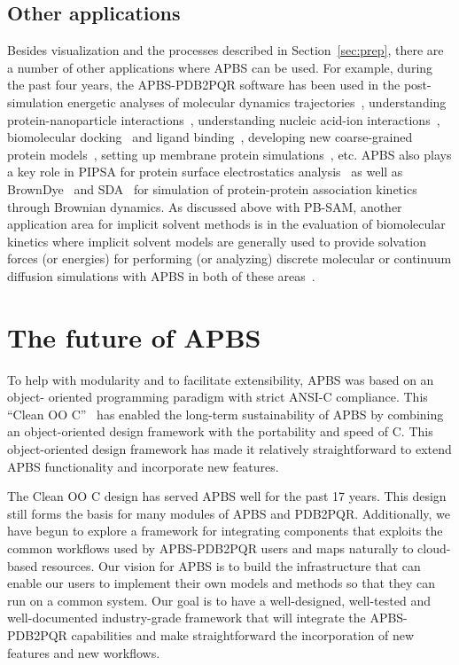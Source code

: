 \documentclass[12pt,titlepage]{article}
\newcommand{\revision}[1]{#1}
\begin{document}
\subsection{Other applications}
Besides visualization and the processes described in Section~\ref{sec:prep}, there are a number of other applications where APBS can be used.
For example, during the past four years, the APBS-PDB2PQR software has been used in the post-simulation energetic analyses of molecular dynamics trajectories~\cite{Dror2013}, understanding protein-nanoparticle interactions~\cite{Treuel2013, DePaoli2014}, understanding nucleic acid-ion interactions~\cite{Lipfert2014}, biomolecular docking~\cite{Roberts2013} and ligand binding~\cite{Evangelidis2009}, developing new coarse-grained protein models~\cite{Spiga2013}, setting up membrane protein simulations~\cite{Stansfeld2015}, etc.
APBS also plays a key role in PIPSA for protein surface electrostatics analysis~\cite{Richter2008} as well as BrownDye~\cite{BrownDye} and SDA~\cite{Martinez2015} for simulation of protein-protein association kinetics through Brownian dynamics.
As discussed above with PB-SAM, another application area for implicit solvent methods is in the evaluation of biomolecular kinetics where implicit solvent models are generally used to provide solvation forces (or energies) for performing (or analyzing) discrete molecular or continuum diffusion simulations with APBS in both of these areas~\cite{Dror2013, Martinez2015, Cheng2007, Cheng2007a, Song2004a, Song2004a, Elcock2004, Mereghetti2012}.

\section{The future of APBS}
\revision{To help with modularity and to facilitate extensibility, APBS was based on an object- oriented programming paradigm with strict ANSI-C compliance.
This ``Clean OO C''~\cite{CleanOOC} has enabled the long-term sustainability of APBS by combining an object-oriented design framework with the portability and speed of C.}
This object-oriented design framework has made it relatively straightforward to extend APBS functionality and incorporate new features.

The Clean OO C design has served APBS well for the past 17 years.
This design still forms the basis for many modules of APBS and PDB2PQR.
Additionally, we have begun to explore a framework for integrating components that exploits the common workflows used by APBS-PDB2PQR users and maps naturally to cloud-based resources.
Our vision for APBS is to build the infrastructure that can enable our users to implement their own models and methods so that they can run on a common system.
Our goal is to have a well-designed, well-tested and well-documented industry-grade framework that will integrate the APBS-PDB2PQR capabilities and make straightforward the incorporation of new features and new workflows.
\end{document}
